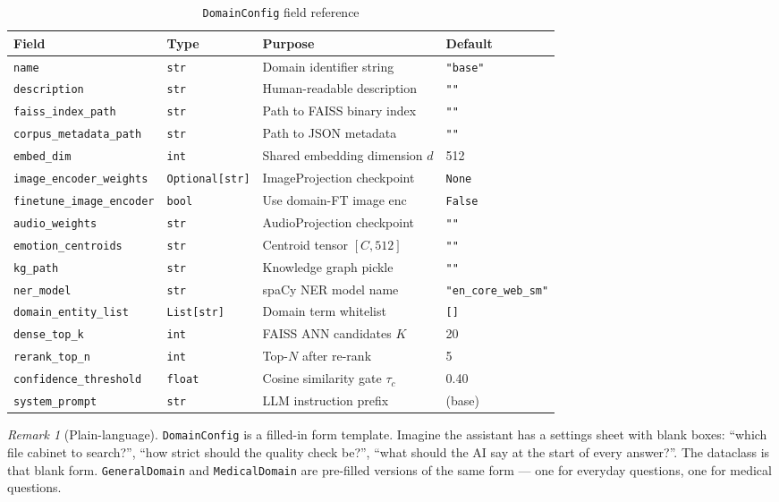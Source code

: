 \documentclass[12pt,a4paper]{article}
\theoremstyle{definition}
\theoremstyle{remark}
\newtheorem{remark}[theorem]{Remark}
\begin{document}
\begin{table}[H]
\centering
\caption{\texttt{DomainConfig} field reference}
\begin{tabularx}{\textwidth}{llXl}
\toprule
Field & Type & Purpose & Default \\
\midrule
\texttt{name} & \texttt{str} & Domain identifier string & \texttt{"base"} \\
\texttt{description} & \texttt{str} & Human-readable description & \texttt{""} \\
\texttt{faiss\_index\_path} & \texttt{str} & Path to FAISS binary index & \texttt{""} \\
\texttt{corpus\_metadata\_path} & \texttt{str} & Path to JSON metadata & \texttt{""} \\
\texttt{embed\_dim} & \texttt{int} & Shared embedding dimension $d$ & 512 \\
\texttt{image\_encoder\_weights} & \texttt{Optional[str]} & ImageProjection checkpoint & \texttt{None} \\
\texttt{finetune\_image\_encoder} & \texttt{bool} & Use domain-FT image enc & \texttt{False} \\
\texttt{audio\_weights} & \texttt{str} & AudioProjection checkpoint & \texttt{""} \\
\texttt{emotion\_centroids} & \texttt{str} & Centroid tensor $[C,512]$ & \texttt{""} \\
\texttt{kg\_path} & \texttt{str} & Knowledge graph pickle & \texttt{""} \\
\texttt{ner\_model} & \texttt{str} & spaCy NER model name & \texttt{"en\_core\_web\_sm"} \\
\texttt{domain\_entity\_list} & \texttt{List[str]} & Domain term whitelist & \texttt{[]} \\
\texttt{dense\_top\_k} & \texttt{int} & FAISS ANN candidates $K$ & 20 \\
\texttt{rerank\_top\_n} & \texttt{int} & Top-$N$ after re-rank & 5 \\
\texttt{confidence\_threshold} & \texttt{float} & Cosine similarity gate $\tau_c$ & 0.40 \\
\texttt{system\_prompt} & \texttt{str} & LLM instruction prefix & (base) \\
\bottomrule
\end{tabularx}
\end{table}

\begin{remark}[Plain-language]
\texttt{DomainConfig} is a filled-in form template.
Imagine the assistant has a settings sheet with blank boxes:
``which file cabinet to search?'', ``how strict should the quality check be?'',
``what should the AI say at the start of every answer?''.
The dataclass is that blank form.
\texttt{GeneralDomain} and \texttt{MedicalDomain} are pre-filled versions
of the same form — one for everyday questions, one for medical questions.
\end{remark}
\end{document}
